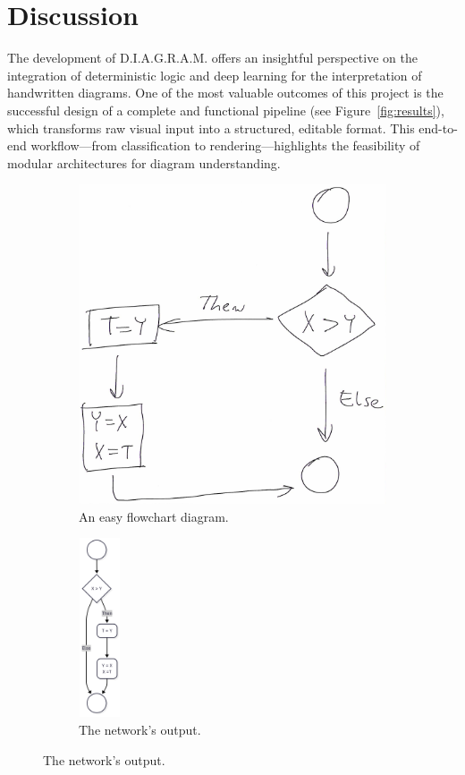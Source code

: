 \documentclass[conference]{IEEEtran}
\begin{document}
\section{Discussion}

The development of D.I.A.G.R.A.M. offers an insightful perspective on the integration of deterministic logic and deep learning for the interpretation of handwritten diagrams. One of the most valuable outcomes of this project is the successful design of a complete and functional pipeline (see Figure~\ref{fig:results}), which transforms raw visual input into a structured, editable format. This end-to-end workflow—from classification to rendering—highlights the feasibility of modular architectures for diagram understanding.

\begin{figure}[htbp]
	\centering
	
	\begin{subfigure}[b]{0.45\linewidth}
		\includegraphics[width=\linewidth]{ex1.png}
		\caption{An easy flowchart diagram.}
	\end{subfigure}
	\hfill
	\begin{subfigure}[b]{0.45\linewidth}
		\includegraphics[width=35pt, height=150pt]{ex2.png}
		\caption{The network's output.}
	\end{subfigure}
	

\end{figure}
\end{document}
